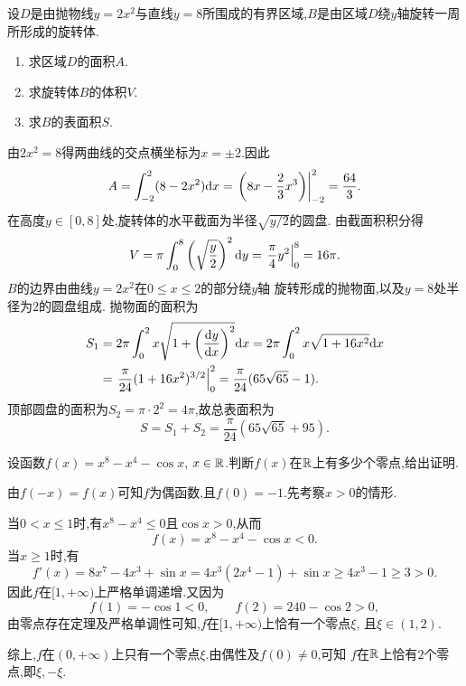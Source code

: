 \documentclass{ctexart}
\begin{document}
\begin{problem}[7.(20\songti{分})]
设$D$是由抛物线$y=2x^2$与直线$y=8$所围成的有界区域,$B$是由区域$D$绕$y$轴旋转一周所形成的旋转体.
\begin{enumerate}[label=\tbf{(\alph*)},leftmargin=*,topsep=0pt,parsep=0pt,itemsep=0pt,partopsep=0pt]
\item 求区域$D$的面积$A$.
\item 求旋转体$B$的体积$V$.
\item 求$B$的表面积$S$.
\end{enumerate}
\end{problem}
\begin{solution}
 由$2x^2=8$得两曲线的交点横坐标为$x=\pm2$.因此
\[
{A=\int_{-2}^2(8-2x^2)\mathrm{d} x
=\left.\left(8x-\dfrac23x^3\right)\right|_{-2}^2
=\dfrac{64}{3}.}
\]
 在高度$y\in[0,8]$处,旋转体的水平截面为半径$\sqrt{y/2}$的圆盘.
由截面积积分得
\[
{V=\pi\int_0^8\left(\sqrt{\dfrac y2}\right)^2\mathrm{d} y
=\left.\dfrac\pi4y^2\right|_0^8=16\pi.}
\]
 $B$的边界由曲线$y=2x^2$在$0\leqslant x\leqslant2$的部分绕$y$轴
旋转形成的抛物面,以及$y=8$处半径为$2$的圆盘组成.
抛物面的面积为
\[
\begin{aligned}
S_1
&=2\pi\int_0^2x\sqrt{1+\left(\dfrac{\mathrm{d} y}{\mathrm{d} x}\right)^2}\mathrm{d} x
=2\pi\int_0^2x\sqrt{1+16x^2}\mathrm{d} x\\
&=\left.\dfrac\pi{24}(1+16x^2)^{3/2}\right|_0^2
=\dfrac\pi{24}(65\sqrt{65}-1).
\end{aligned}
\]
顶部圆盘的面积为$S_2=\pi\cdot2^2=4\pi$,故总表面积为
\[
{S=S_1+S_2=\dfrac\pi{24}(65\sqrt{65}+95).}
\]
\end{solution}

\begin{problem}[8.(10\songti{分})]
设函数$f(x)=x^8-x^4-\cos x$, $x\in\mathbb{R}$.判断$f(x)$在$\mathbb{R}$上有多少个零点,给出证明.
\end{problem}
\begin{solution}
由$f(-x)=f(x)$可知$f$为偶函数,且$f(0)=-1$.先考察$x>0$的情形.

当$0<x\leqslant1$时,有$x^8-x^4\leqslant0$且$\cos x>0$,从而
\[
f(x)=x^8-x^4-\cos x<0.
\]
当$x\geqslant1$时,有
\[
f'(x)=8x^7-4x^3+\sin x
=4x^3(2x^4-1)+\sin x
\geqslant4x^3-1\geqslant3>0.
\]
因此$f$在$[1,+\infty)$上严格单调递增.又因为
\[
f(1)=-\cos1<0,\qquad f(2)=240-\cos2>0,
\]
由零点存在定理及严格单调性可知,$f$在$[1,+\infty)$上恰有一个零点$\xi$,
且$\xi\in(1,2)$.

综上,$f$在$(0,+\infty)$上只有一个零点$\xi$.由偶性及$f(0)\ne0$,可知
$f$在$\mathbb{R}$上恰有${2}$个零点,即${\xi,-\xi}$.
\end{solution}
\end{document}
